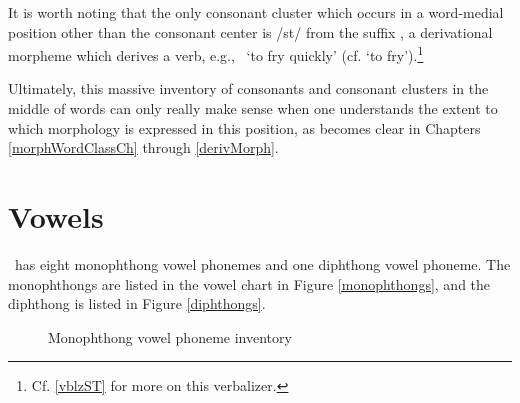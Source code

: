 It is worth noting that the only consonant cluster which occurs in a word-medial position other than the consonant center is /st/ from the suffix , a derivational morpheme
which derives a verb, e.g.,~ ‘to fry quickly’ (cf. \mbox{} ‘to fry’).\footnote{Cf. \SEC\ref{vblzST} for more on this verbalizer.} %

Ultimately, this massive inventory of consonants and consonant clusters in the middle of words can only really make sense when one understands the extent to which morphology is expressed in this position, as becomes clear in Chapters \ref{morphWordClassCh} through \ref{derivMorph}. 



\FB

\section{Vowels}\label{vowelPhonemes}%
\PS\ has eight monophthong vowel phonemes and one diphthong vowel phoneme. The monophthongs are listed in the vowel chart in Figure \vref{monophthongs}, and the diphthong is listed in Figure \vref{diphthongs}. 
\begin{figure}[h]
\centering
\begin{vowel} %
\end{vowel}
\caption[Monophthong inventory]{Monophthong vowel phoneme inventory} \label{monophthongs}
\end{figure}

